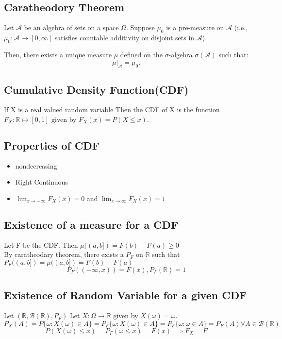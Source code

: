 \documentclass{article}
\begin{document}
\subsection{Caratheodory Theorem}
Let \(\mathcal{A}\) be an algebra of sets  on a space \(\Omega\). Suppose \(\mu_0\) is a pre-measure on \(\mathcal{A}\) (i.e., \(\mu_0: \mathcal{A} \to [0, \infty]\) satisfies countable additivity on disjoint sets in \(\mathcal{A}\)).

Then, there exists a unique measure \(\mu\) defined on the \(\sigma\)-algebra \(\sigma(\mathcal{A})\) such that:
\[
\mu|_{\mathcal{A}} = \mu_0.
\]

\subsection{Cumulative Density Function(CDF)}
If  X is a real valued random variable Then the CDF of X is the function $F_X : \mathbb{R} \mapsto [0,1]$ given by $F_X(x) = P(X\leq x).$ 
\subsection{Properties of CDF}
\begin{itemize}
    \item nondecreasing
    \item Right Continuous 
    \item $\lim_{x \to -\infty} F_X(x ) = 0$ and $\lim_{x \to \infty} F_X(x ) = 1$
\end{itemize}

\subsection{Existence of a measure for a CDF}
Let F be the CDF. Then $\mu ((a,b]) = F(b) - F(a) \geq 0$\\
 By caratheodary theorem, there exists a $P_F$ on $\mathbb{R}$ such that  $P_F((a,b]) = \mu ((a,b]) = F(b)-F(a)$
\\
$$P_F((-\infty , x)) = F(x) ,  P_F(\mathbb{R}) = 1$$
\subsection{Existence of Random Variable for a given CDF}
Let $(\mathbb{R}, \mathcal{B}(\mathbb{R} ), P_F )$ Let $X: \Omega \to \mathbb{R}$ given by $X(\omega)=\omega$. $$P_X(A)= P\{ \omega: X(\omega) \in A \}= P_F\{\omega: X(\omega) \in A \}= P_F\{\omega: \omega \in A \} = P_F(A) \forall A \in \mathcal{B}(\mathbb{R} )  $$
$$P(X(\omega)\leq x) = P_F(\omega \leq x) = F(x) \implies F_X = F$$
\end{document}
